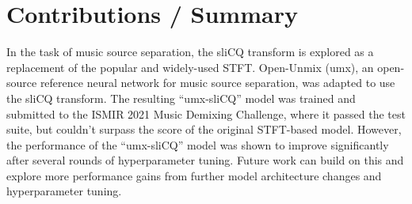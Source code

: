 \documentclass[letter,12pt]{scrartcl}
\begin{document}
\section{Contributions / Summary}

In the task of music source separation, the sliCQ transform is explored as a replacement of the popular and widely-used STFT. Open-Unmix (umx), an open-source reference neural network for music source separation, was adapted to use the sliCQ transform. The resulting ``umx-sliCQ'' model was trained and submitted to the ISMIR 2021 Music Demixing Challenge, where it passed the test suite, but couldn't surpass the score of the original STFT-based model. However, the performance of the ``umx-sliCQ'' model was shown to improve significantly after several rounds of hyperparameter tuning. Future work can build on this and explore more performance gains from further model architecture changes and hyperparameter tuning.

\vfill
\clearpage %

\printbibheading[title={References},heading=bibnumbered]
\printbibliography[heading=none]

\vfill
\clearpage %
\end{document}
